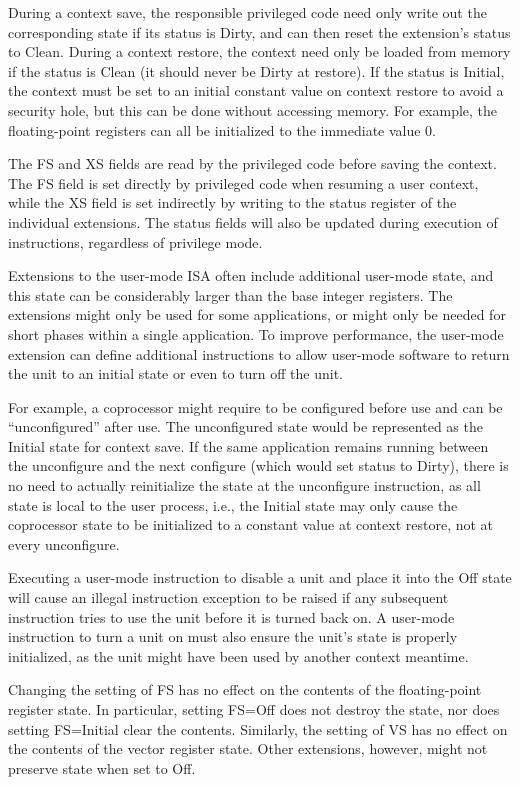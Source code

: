 During a context save, the responsible privileged code need only write
out the corresponding state if its status is Dirty, and can then reset
the extension's status to Clean.  During a context restore, the
context need only be loaded from memory if the status is Clean (it
should never be Dirty at restore).  If the status is Initial, the
context must be set to an initial constant value on context restore to
avoid a security hole, but this can be done without accessing memory.
For example, the floating-point registers can all be initialized to
the immediate value 0.

The FS and XS fields are read by the privileged code before saving the
context.  The FS field is set directly by privileged code when
resuming a user context, while the XS field is set indirectly by
writing to the status register of the individual extensions.  The
status fields will also be updated during execution of instructions,
regardless of privilege mode.

Extensions to the user-mode ISA often include additional user-mode
state, and this state can be considerably larger than the base integer
registers.  The extensions might only be used for some applications,
or might only be needed for short phases within a single application.
To improve performance, the user-mode extension can define additional
instructions to allow user-mode software to return the unit to an
initial state or even to turn off the unit.

For example, a coprocessor might require to be configured before use
and can be ``unconfigured'' after use.  The unconfigured state would
be represented as the Initial state for context save.  If the same
application remains running between the unconfigure and the next
configure (which would set status to Dirty), there is no need to
actually reinitialize the state at the unconfigure instruction, as all
state is local to the user process, i.e., the Initial state may only
cause the coprocessor state to be initialized to a constant value at
context restore, not at every unconfigure.

Executing a user-mode instruction to disable a unit and place it into
the Off state will cause an illegal instruction exception to be raised
if any subsequent instruction tries to use the unit before it is
turned back on.  A user-mode instruction to turn a unit on must also
ensure the unit's state is properly initialized, as the unit might
have been used by another context meantime.

Changing the setting of FS has no effect on the contents of the floating-point
register state.  In particular, setting FS=Off does not destroy the state, nor
does setting FS=Initial clear the contents.
Similarly, the setting of VS has no effect on the contents of the vector register
state.
Other extensions, however, might not preserve state when set to Off.

